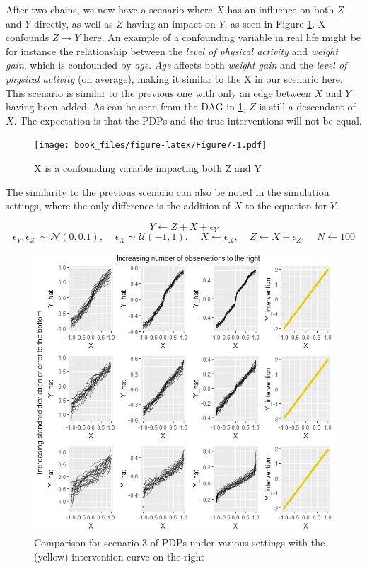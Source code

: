 \documentclass[
]{krantz}
\begin{document}
After two chains, we now have a scenario where \(X\) has an influence on both \(Z\) and \(Y\) directly, as well as \(Z\) having an impact on \(Y\), as seen in Figure \ref{fig:Figure7}. X confounds \(Z \rightarrow Y\) here. An example of a confounding variable in real life might be for instance the relationship between the \emph{level of physical activity} and \emph{weight gain}, which is confounded by \emph{age}. \emph{Age} affects both \emph{weight gain} and the \emph{level of physical activity} (on average), making it similar to the X in our scenario here. This scenario is similar to the previous one with only an edge between \(X\) and \(Y\) having been added. As can be seen from the DAG in \ref{fig:Figure7}, \(Z\) is still a descendant of \(X\). The expectation is that the PDPs and the true interventions will not be equal.

\begin{figure}
\centering
\texttt{[image: book\_files/figure-latex/Figure7-1.pdf]}
\caption{\label{fig:Figure7}X is a confounding variable impacting both Z and Y}
\end{figure}

The similarity to the previous scenario can also be noted in the simulation settings, where the only difference is the addition of \(X\) to the equation for \(Y\).

\[ Y \leftarrow Z + X + \epsilon_Y  \]
\[ \epsilon_Y,\epsilon_Z ~ \sim \mathcal{N}(0, 0.1), \ \ \ \ \ \epsilon_X \sim \mathcal{U}(-1,1), \ \ \ \ \ X \leftarrow \epsilon_X, \ \ \ \ \ Z \leftarrow X + \epsilon_Z, \ \ \ \ \ N \leftarrow 100 \]

\begin{figure}

\includegraphics[width=1\linewidth]{images/scenario3_all} \hfill{}

\caption{Comparison for scenario 3 of PDPs under various settings with the (yellow) intervention curve on the right}\label{fig:Figure8}
\end{figure}
\end{document}
